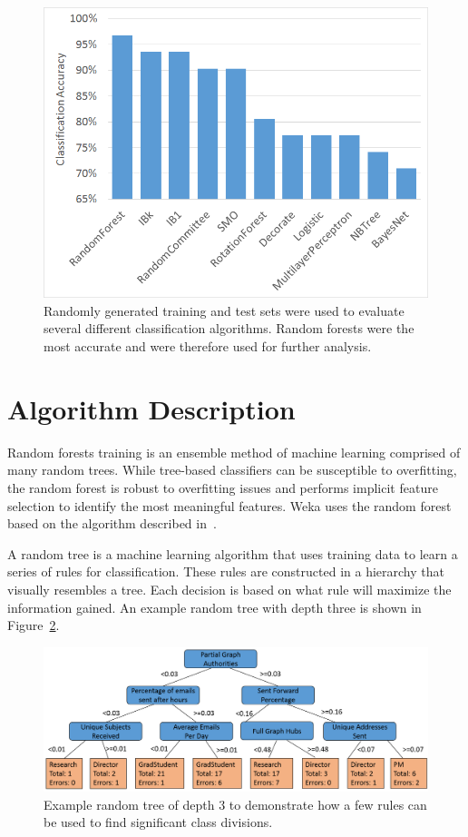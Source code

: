 \documentclass[12pt]{report}
\begin{document}
\begin{figure}[t]
	\centering
	\includegraphics[width=0.8\columnwidth,trim={0mm 0mm 0mm 0mm},clip]{ModelSelection}
	\vspace{-12pt}
	\caption[Algorithm selection analysis]{Randomly generated training and test sets were used to evaluate several different classification algorithms.  Random forests were the most accurate and were therefore used for further analysis.}
	\label{fig:algorithm_selection}
\end{figure}


\section{Algorithm Description} \label{sec:InfoGain}
Random forests training is an ensemble method of machine learning comprised of many random trees.
While tree-based classifiers can be susceptible to overfitting, the random forest is robust to overfitting issues and performs implicit feature selection to identify the most meaningful features.  
Weka uses the random forest based on the algorithm described in~\cite{Breiman2001}.

A random tree is a machine learning algorithm that uses training data to learn a series of rules for classification.
These rules are constructed in a hierarchy that visually resembles a tree.
Each decision is based on what rule will maximize the information gained.
An example random tree with depth three is shown in Figure~\ref{fig:ex_tree}.

\begin{figure}[t]
    \centering
    \includegraphics[width=\columnwidth,trim={0mm 0mm 0mm 0mm},clip]{3_level_tree}
    \vspace{-12pt}
    \caption[Example random tree]{Example random tree of depth 3 to demonstrate how a few rules can be used to find significant class divisions.}
    \label{fig:ex_tree}
\end{figure}
\end{document}
